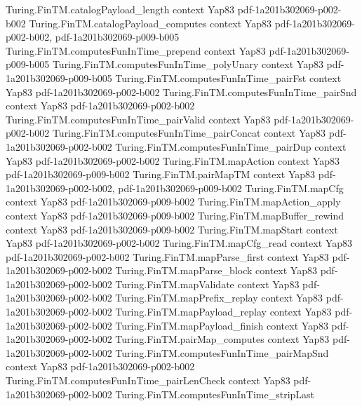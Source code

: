 \begin{theorem}
\proofstep
  {Turing.FinTM.catalogPayload_length}
  {context}
  {Yap83}
  {pdf-1a201b302069-p002-b002}
\proofstep
  {Turing.FinTM.catalogPayload_computes}
  {context}
  {Yap83}
  {pdf-1a201b302069-p002-b002,
    pdf-1a201b302069-p009-b005}
\proofstep
  {Turing.FinTM.computesFunInTime_prepend}
  {context}
  {Yap83}
  {pdf-1a201b302069-p009-b005}
\proofstep
  {Turing.FinTM.computesFunInTime_polyUnary}
  {context}
  {Yap83}
  {pdf-1a201b302069-p009-b005}
\proofstep
  {Turing.FinTM.computesFunInTime_pairFst}
  {context}
  {Yap83}
  {pdf-1a201b302069-p002-b002}
\proofstep
  {Turing.FinTM.computesFunInTime_pairSnd}
  {context}
  {Yap83}
  {pdf-1a201b302069-p002-b002}
\proofstep
  {Turing.FinTM.computesFunInTime_pairValid}
  {context}
  {Yap83}
  {pdf-1a201b302069-p002-b002}
\proofstep
  {Turing.FinTM.computesFunInTime_pairConcat}
  {context}
  {Yap83}
  {pdf-1a201b302069-p002-b002}
\proofstep
  {Turing.FinTM.computesFunInTime_pairDup}
  {context}
  {Yap83}
  {pdf-1a201b302069-p002-b002}
\proofstep
  {Turing.FinTM.mapAction}
  {context}
  {Yap83}
  {pdf-1a201b302069-p009-b002}
\proofstep
  {Turing.FinTM.pairMapTM}
  {context}
  {Yap83}
  {pdf-1a201b302069-p002-b002,
    pdf-1a201b302069-p009-b002}
\proofstep
  {Turing.FinTM.mapCfg}
  {context}
  {Yap83}
  {pdf-1a201b302069-p009-b002}
\proofstep
  {Turing.FinTM.mapAction_apply}
  {context}
  {Yap83}
  {pdf-1a201b302069-p009-b002}
\proofstep
  {Turing.FinTM.mapBuffer_rewind}
  {context}
  {Yap83}
  {pdf-1a201b302069-p009-b002}
\proofstep
  {Turing.FinTM.mapStart}
  {context}
  {Yap83}
  {pdf-1a201b302069-p002-b002}
\proofstep
  {Turing.FinTM.mapCfg_read}
  {context}
  {Yap83}
  {pdf-1a201b302069-p002-b002}
\proofstep
  {Turing.FinTM.mapParse_first}
  {context}
  {Yap83}
  {pdf-1a201b302069-p002-b002}
\proofstep
  {Turing.FinTM.mapParse_block}
  {context}
  {Yap83}
  {pdf-1a201b302069-p002-b002}
\proofstep
  {Turing.FinTM.mapValidate}
  {context}
  {Yap83}
  {pdf-1a201b302069-p002-b002}
\proofstep
  {Turing.FinTM.mapPrefix_replay}
  {context}
  {Yap83}
  {pdf-1a201b302069-p002-b002}
\proofstep
  {Turing.FinTM.mapPayload_replay}
  {context}
  {Yap83}
  {pdf-1a201b302069-p002-b002}
\proofstep
  {Turing.FinTM.mapPayload_finish}
  {context}
  {Yap83}
  {pdf-1a201b302069-p002-b002}
\proofstep
  {Turing.FinTM.pairMap_computes}
  {context}
  {Yap83}
  {pdf-1a201b302069-p002-b002}
\proofstep
  {Turing.FinTM.computesFunInTime_pairMapSnd}
  {context}
  {Yap83}
  {pdf-1a201b302069-p002-b002}
\proofstep
  {Turing.FinTM.computesFunInTime_pairLenCheck}
  {context}
  {Yap83}
  {pdf-1a201b302069-p002-b002}
\proofstep
  {Turing.FinTM.computesFunInTime_stripLast}

\end{theorem}
